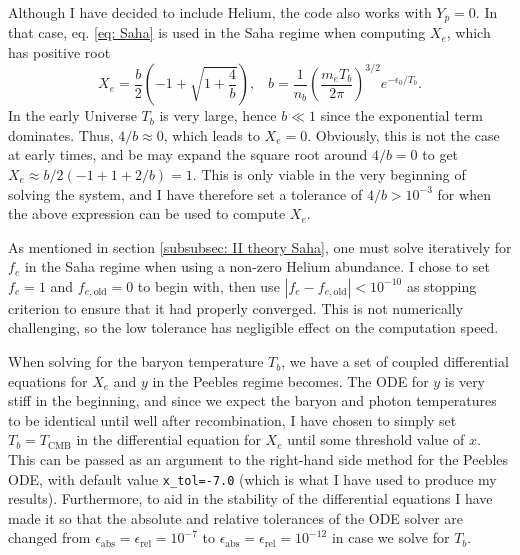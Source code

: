 \documentclass{aa}
\numberwithin{equation}{section}
\numberwithin{table}{section}
\numberwithin{figure}{section}
\begin{document}
Although I have decided to include Helium, the code also works with $Y_p=0$. In that case, eq. \eqref{eq: Saha} is used in the Saha regime when computing $X_e$, which has positive root
\begin{equation}
  X_e = \frac{b}{2}\left(-1+\sqrt{1 + \frac{4}{b}}\right), \hspace{10pt} b = \frac{1}{n_b}\left( \frac{m_eT_b}{2\pi}\right)^{3/2}e^{-\epsilon_0/T_b}.
\end{equation}
In the early Universe $T_b$ is very large, hence $b\ll 1$ since the exponential term dominates. Thus, $4/b\approx0$, which leads to $X_e = 0$. Obviously, this is not the case at early times, and be may expand the square root around $4/b = 0$ to get $X_e \approx b/2(-1 + 1 + 2/b)=1$. This is only viable in the very beginning of solving the system, and I have therefore set a tolerance of $4/b>10^{-3}$ for when the above expression can be used to compute $X_e$.

As mentioned in section \ref{subsubsec: II theory Saha}, one must solve iteratively for $f_e$ in the Saha regime when using a non-zero Helium abundance. I chose to set $f_e = 1$ and $f_{e,\text{old}}=0$ to begin with, then use $\left|f_e-f_{e,\text{old}}\right|<10^{-10}$ as stopping criterion to ensure that it had properly converged. This is not numerically challenging, so the low tolerance has negligible effect on the computation speed.

When solving for the baryon temperature $T_b$, we have a set of coupled differential equations for $X_e$ and $y$ in the Peebles regime becomes. The ODE for $y$ is very stiff in the beginning, and since we expect the baryon and photon temperatures to be identical until well after recombination, I have chosen to simply set $T_b=T_\text{CMB}$ in the differential equation for $X_e$ until some threshold value of $x$. This can be passed as an argument to the right-hand side method for the Peebles ODE, with default value \verb|x_tol=-7.0| (which is what I have used to produce my results). Furthermore, to aid in the stability of the differential equations I have made it so that the absolute and relative tolerances of the ODE solver are changed from $\epsilon_\text{abs}=\epsilon_\text{rel}=10^{-7}$ to $\epsilon_\text{abs}=\epsilon_\text{rel}=10^{-12}$ in case we solve for $T_b$. 
\end{document}
